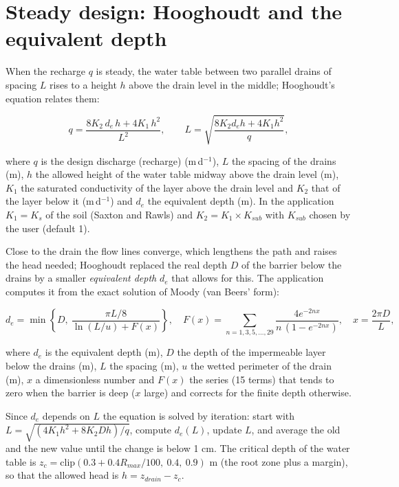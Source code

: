 \section{Steady design: Hooghoudt and the equivalent depth}
When the recharge $q$ is steady, the water table between two parallel drains of spacing $L$ rises to a height $h$ above the drain level in the middle; Hooghoudt's equation relates them:

\begin{equation}\boxed{q=\frac{8K_2\,d_e\,h+4K_1\,h^{2}}{L^{2}},\qquad L=\sqrt{\frac{8K_2d_eh+4K_1h^2}{q}},}\label{eq:dr-h}\end{equation}
\par\noindent where $q$ is the design discharge (recharge) (m\,d$^{-1}$), $L$ the spacing of the drains (m), $h$ the allowed height of the water table midway above the drain level (m), $K_1$ the saturated conductivity of the layer above the drain level and $K_2$ that of the layer below it (m\,d$^{-1}$) and $d_e$ the equivalent depth (m). In the application $K_1=K_s$ of the soil (Saxton and Rawls) and $K_2=K_1\times K_{sub}$ with $K_{sub}$ chosen by the user (default 1).



Close to the drain the flow lines converge, which lengthens the path and raises the head needed; Hooghoudt replaced the real depth $D$ of the barrier below the drains by a smaller \emph{equivalent depth} $d_e$ that allows for this. The application computes it from the exact solution of Moody (van Beers' form):

\begin{equation}\boxed{d_e=\min\left\{D,\ \frac{\pi L/8}{\ln(L/u)+F(x)}\right\},\quad F(x)=\sum_{n=1,3,5,\ldots,29}\frac{4e^{-2nx}}{n\,(1-e^{-2nx})},\quad x=\frac{2\pi D}{L},}\label{eq:dr-de}\end{equation}
\par\noindent where $d_e$ is the equivalent depth (m), $D$ the depth of the impermeable layer below the drains (m), $L$ the spacing (m), $u$ the wetted perimeter of the drain (m), $x$ a dimensionless number and $F(x)$ the series (15 terms) that tends to zero when the barrier is deep ($x$ large) and corrects for the finite depth otherwise.



Since $d_e$ depends on $L$ the equation is solved by iteration: start with $L=\sqrt{(4K_1h^2+8K_2Dh)/q}$, compute $d_e(L)$, update $L$, and average the old and the new value until the change is below 1 cm. The critical depth of the water table is $z_c=\mathrm{clip}(0.3+0.4R_{max}/100,\ 0.4,\ 0.9)$ m (the root zone plus a margin), so that the allowed head is $h=z_{drain}-z_c$.

